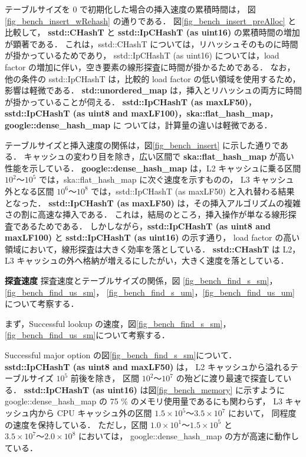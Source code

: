 テーブルサイズを 0 で初期化した場合の挿入速度の累積時間は，
図\ref{fig_bench_insert_wRehash} の通りである．
図\ref{fig_bench_insert_preAlloc} と比較して，
{\bf sstd::CHashT} と {\bf sstd::IpCHashT (as uint16)} の累積時間の増加が顕著である．
これは，sstd::CHashT については，リハッシュそのものに時間が掛かっているためであり，
sstd::IpCHashT (as uint16) については，load factor の増加に伴い，空き要素の線形探査に時間が掛かるためである．
なお，他の条件の sstd::IpCHashT は，比較的 load factor の低い領域を使用するため，影響は軽微である．
{\bf std::unordered\_map} は，挿入とリハッシュの両方に時間が掛かっていることが伺える．
{\bf sstd::IpCHashT (as maxLF50)}，{\bf sstd::IpCHashT (as uint8 and maxLF100)}，{\bf ska::flat\_hash\_map}，{\bf google::dense\_hash\_map} に
ついては，計算量の違いは軽微である．

テーブルサイズと挿入速度の関係は，図\ref{fig_bench_insert} に示した通りである．
キャッシュの変わり目を除き，広い区間で {\bf ska::flat\_hash\_map} が高い性能を示している．
{\bf google::dense\_hash\_map} は，L2 キャッシュに乗る区間 $10^2〜 10^5$ では，ska::flat\_hash\_map に次ぐ速度を示すものの，
L3 キャッシュ外となる区間 $10^6〜 10^8$ では，sstd::IpCHashT (as maxLF50) と入れ替わる結果となった．
{\bf sstd::IpCHashT (as maxLF50)} は，その挿入アルゴリズムの複雑さの割に高速な挿入である．
これは，結局のところ，挿入操作が単なる線形探査であるためである．
しかしながら，{\bf sstd::IpCHashT (as uint8 and maxLF100)} と {\bf sstd::IpCHashT (as uint16)} の示す通り，
load factor の高い領域において，線形探査は大きく効率を落としている．
{\bf sstd::CHashT} は L2，L3 キャッシュの外へ格納が増えるにしたがい，大きく速度を落としている．
\leavevmode \newline

%
{\bf 探査速度}
\samepage\newline\indent
探査速度とテーブルサイズの関係，図
\ref{fig_bench_find_s_sm}，\ref{fig_bench_find_us_sm}，
\ref{fig_bench_find_s_um}，\ref{fig_bench_find_us_um}について考察する．

まず，Successful lookup の速度，図\ref{fig_bench_find_s_sm}，\ref{fig_bench_find_us_sm}について考察する．

Successful major option の図\ref{fig_bench_find_s_sm}について．
{\bf sstd::IpCHashT (as uint8 and maxLF50)} は，
L2 キャッシュから溢れるテーブルサイズ $10^5$ 前後を除き，
区間 $10^2〜10^7$ の殆どに渡り最速で探査している．
{\bf sstd::IpCHashT (as uint16)} は図\ref{fig_bench_memory} に示すように
google::dense\_hash\_map の 75 \% のメモリ使用量であるにも関わらず，
L3 キャッシュ内から CPU キャッシュ外の区間 $1.5\times10^5〜3.5\times10^7$ において，
同程度の速度を保持している．
ただし，区間 $1.0\times10^1〜1.5\times10^5$ と $3.5\times10^7〜2.0\times10^8$ においては，
google::dense\_hash\_map の方が高速に動作している．

